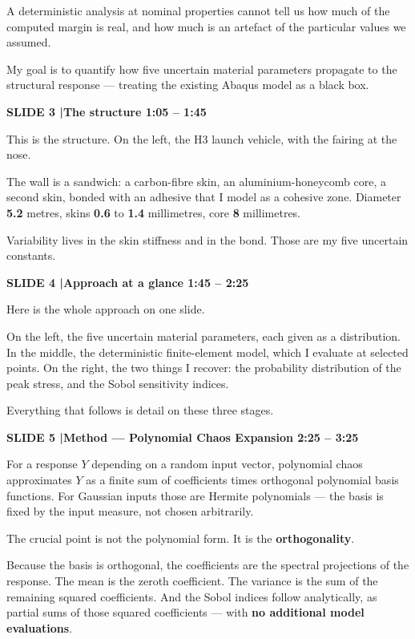 \documentclass[12pt,a4paper]{article}
\newcommand{\slide}[3]{%
  \bigskip
  \noindent\colorbox{luhblue}{\parbox{\dimexpr\linewidth-2\fboxsep}{%
    \color{white}\bfseries\small SLIDE #1 \quad|\quad #2 \hfill #3}}\par
  \nopagebreak\vspace{0.3em}}
\newcommand{\num}[1]{\textbf{#1}}
\begin{document}
A deterministic analysis at nominal properties cannot tell us how much of the computed
margin is real, and how much is an artefact of the particular values we assumed.

My goal is to quantify how five uncertain material parameters propagate to the
structural response --- treating the existing Abaqus model as a black box.

\slide{3}{The structure}{1:05 -- 1:45}

This is the structure. On the left, the H3 launch vehicle, with the fairing at the nose.

The wall is a sandwich: a carbon-fibre skin, an aluminium-honeycomb core, a second skin,
bonded with an adhesive that I model as a cohesive zone. Diameter \num{5.2} metres,
skins \num{0.6} to \num{1.4} millimetres, core \num{8} millimetres.

Variability lives in the skin stiffness and in the bond. Those are my five uncertain
constants.

\slide{4}{Approach at a glance}{1:45 -- 2:25}
Here is the whole approach on one slide.

On the left, the five uncertain material parameters, each given as a distribution.
In the middle, the deterministic finite-element model, which I evaluate at selected
points. On the right, the two things I recover: the probability distribution of the
peak stress, and the Sobol sensitivity indices.

Everything that follows is detail on these three stages.

\slide{5}{Method --- Polynomial Chaos Expansion}{2:25 -- 3:25}

For a response $Y$ depending on a random input vector, polynomial chaos approximates $Y$
as a finite sum of coefficients times orthogonal polynomial basis functions. For Gaussian
inputs those are Hermite polynomials --- the basis is fixed by the input measure, not
chosen arbitrarily.

The crucial point is not the polynomial form. It is the \textbf{orthogonality}.

Because the basis is orthogonal, the coefficients are the spectral projections of the
response. The mean is the zeroth coefficient. The variance is the sum of the remaining
squared coefficients. And the Sobol indices follow analytically, as partial sums of those
squared coefficients --- with \textbf{no additional model evaluations}.
\end{document}
